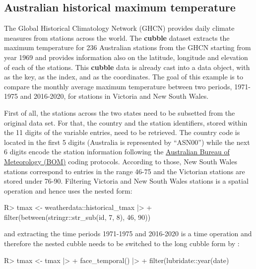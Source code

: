 \documentclass[
]{jss}
\begin{document}
\hypertarget{australian-historical-maximum-temperature}{%
\subsection{Australian historical maximum temperature}\label{australian-historical-maximum-temperature}}

The Global Historical Climatology Network (GHCN) provides daily climate measures from stations across the world. The \textbf{cubble} dataset  extracts the maximum temperature for 236 Australian stations from the GHCN starting from year 1969 and provides information also on the latitude, longitude and elevation of each of the stations. This \textbf{cubble} data is already cast into a  data object, with  as the key,  as the index, and  as the coordinates. The goal of this example is to compare the monthly average maximum temperature between two periods, 1971-1975 and 2016-2020, for stations in Victoria and New South Wales.

First of all, the stations across the two states need to be subsetted from the original  data set. For that, the country and the station identifiers, stored within the 11 digits of the  variable entries, need to be retrieved. The country code is located in the first 5 digits (Australia is represented by ``ASN00'') while the next 6 digits encode the station information following the \href{http://www.bom.gov.au/climate/cdo/about/site-num.shtml}{Australian Bureau of Meteorology (BOM)} coding protocols. According to those, New South Wales stations correspond to entries in the range 46-75 and the Victorian stations are stored under 76-90. Filtering Victoria and New South Wales stations is a spatial operation and hence uses the  nested form:

\begin{CodeChunk}
\begin{CodeInput}
R> tmax <- weatherdata::historical_tmax |>
+   filter(between(stringr::str_sub(id, 7, 8), 46, 90))
\end{CodeInput}
\end{CodeChunk}

and extracting the time periods 1971-1975 and 2016-2020 is a time operation and therefore the nested cubble needs to be switched to the long cubble form by :

\begin{CodeChunk}
\begin{CodeInput}
R> tmax <- tmax |>
+   face_temporal() |>
+   filter(lubridate::year(date) %
\end{CodeInput}
\end{CodeChunk}
\end{document}
